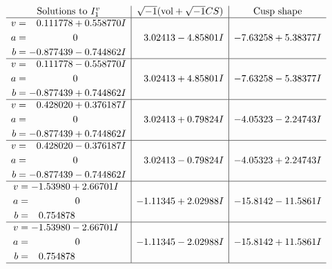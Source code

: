 \documentclass[1p]{elsarticle_modified}
\theoremstyle{definition}
\newcommand{\I}{\sqrt{-1}}
\begin{document}
$$\begin{array}{c|c|c}  
\text{Solutions to }I^v_{1}& \I (\text{vol} + \sqrt{-1}CS) & \text{Cusp shape}\\
 \hline 
\begin{aligned}
v &= \phantom{-}0.111778 + 0.558770 I \\
a &= \phantom{-0.000000 } 0 \\
b &= -0.877439 - 0.744862 I\end{aligned}
 & \phantom{-}3.02413 - 4.85801 I & -7.63258 + 5.38377 I \\ \hline\begin{aligned}
v &= \phantom{-}0.111778 - 0.558770 I \\
a &= \phantom{-0.000000 } 0 \\
b &= -0.877439 + 0.744862 I\end{aligned}
 & \phantom{-}3.02413 + 4.85801 I & -7.63258 - 5.38377 I \\ \hline\begin{aligned}
v &= \phantom{-}0.428020 + 0.376187 I \\
a &= \phantom{-0.000000 } 0 \\
b &= -0.877439 + 0.744862 I\end{aligned}
 & \phantom{-}3.02413 + 0.79824 I & -4.05323 - 2.24743 I \\ \hline\begin{aligned}
v &= \phantom{-}0.428020 - 0.376187 I \\
a &= \phantom{-0.000000 } 0 \\
b &= -0.877439 - 0.744862 I\end{aligned}
 & \phantom{-}3.02413 - 0.79824 I & -4.05323 + 2.24743 I \\ \hline\begin{aligned}
v &= -1.53980 + 2.66701 I \\
a &= \phantom{-0.000000 } 0 \\
b &= \phantom{-}0.754878\phantom{ +0.000000I}\end{aligned}
 & -1.11345 + 2.02988 I & -15.8142 - 11.5861 I \\ \hline\begin{aligned}
v &= -1.53980 - 2.66701 I \\
a &= \phantom{-0.000000 } 0 \\
b &= \phantom{-}0.754878\phantom{ +0.000000I}\end{aligned}
 & -1.11345 - 2.02988 I & -15.8142 + 11.5861 I\\
 \hline 
 \end{array}$$\newpage
\end{document}
